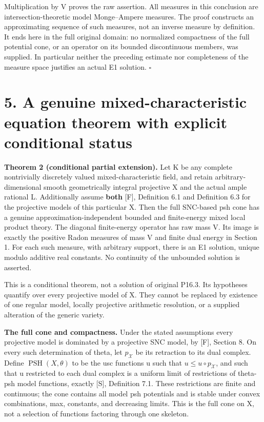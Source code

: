 \documentclass[11pt]{article}
\newcommand{\PSH}{\operatorname{PSH}}
\begin{document}
Multiplication by V proves the raw assertion. All measures in this conclusion are intersection-theoretic model Monge--Ampere measures. The proof constructs an approximating sequence of such measures, not an inverse measure by definition. It ends here in the full original domain: no normalized compactness of the full potential cone, or an operator on its bounded discontinuous members, was supplied. In particular neither the preceding estimate nor completeness of the measure space justifies an actual E1 solution. \(\square\)

\section*{5. A genuine mixed-characteristic equation theorem with explicit conditional status}

\textbf{Theorem 2 (conditional partial extension).} Let K be any complete nontrivially discretely valued mixed-characteristic field, and retain arbitrary-dimensional smooth geometrically integral projective X and the actual ample rational L. Additionally assume \textbf{both} [F], Definition 6.1 and Definition 6.3 for the projective models of this particular X. Then the full SNC-based psh cone has a genuine approximation-independent bounded and finite-energy mixed local product theory. The diagonal finite-energy operator has raw mass V. Its image is exactly the positive Radon measures of mass V and finite dual energy in Section 1. For each such measure, with arbitrary support, there is an E1 solution, unique modulo additive real constants. No continuity of the unbounded solution is asserted.

This is a conditional theorem, not a solution of original P16.3. Its hypotheses quantify over every projective model of X. They cannot be replaced by existence of one regular model, locally projective arithmetic resolution, or a supplied alteration of the generic variety.

\textbf{The full cone and compactness.} Under the stated assumptions every projective model is dominated by a projective SNC model, by [F], Section 8. On every such determination of theta, let \(p_{\mathscr X}\) be its retraction to its dual complex. Define \(\PSH(X,\theta)\) to be the usc functions u such that \(u\leq u\circ p_{\mathscr X}\), and such that u restricted to each dual complex is a uniform limit of restrictions of theta-psh model functions, exactly [S], Definition 7.1. These restrictions are finite and continuous; the cone contains all model psh potentials and is stable under convex combinations, max, constants, and decreasing limits. This is the full cone on X, not a selection of functions factoring through one skeleton.
\end{document}
